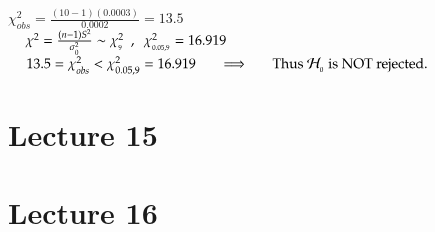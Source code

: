 \documentclass[14pt,twoside,a4paper,fleqn]{article}
\theoremstyle{plain}
\begin{document}
$\chi^2_{obs} = \frac{(10-1)(0.0003)}{0.0002} = 13.5$\hfill\\
$\tab[0.43cm]\chi^2 = \frac{(n-1)S^2}{\sigma^2_{_0}} \sim \chi^2_{_9} \ \ , \ \ \chi^2_{_{0.05, 9}} = 16.919$\hfill\\
$\tab[0.43cm]13.5 = \chi^2_{obs} < \chi^2_{0.05 , 9} = 16.919\tab[0.5cm]\implies\tab[0.5cm]\text{Thus $\mathcal{H}_{_0}$ is NOT rejected.}$

















































\newpage
\section{Lecture 15}

\newpage
\section{Lecture 16} 
 
 
 
 
 
 
 
 
 
 
 
 
 
 
 
\end{document}
